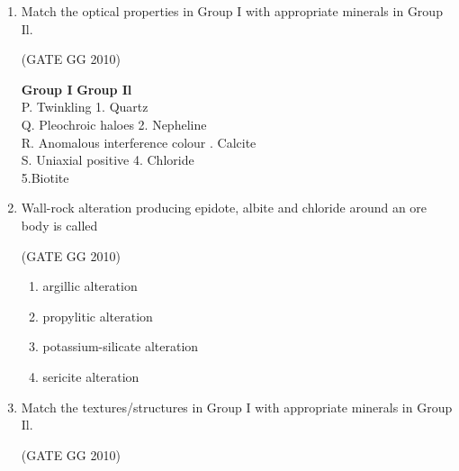 \documentclass[journal]{IEEEtran}
\begin{document}
\begin{enumerate}[start=1]
\item Match the optical properties  in Group I with appropriate minerals in Group Il.

\hfill{(GATE GG 2010)}

\vspace{0.5cm}
\textbf{Group I} \hspace{6cm}
\textbf{Group Il}\\
P. Twinkling \qquad \qquad \qquad \qquad \hspace{2.73cm}1. Quartz\\
Q. Pleochroic haloes \qquad \qquad \qquad \qquad \hspace{1.4cm}       2. Nepheline\\
R. Anomalous interference colour \qquad \qquad \qquad {}. Calcite\\
S. Uniaxial positive \quad \qquad \qquad \qquad  \hspace{1.9cm}  4. Chloride\\\hspace*{7.43cm}5.Biotite
\begin{enumerate}
\end{enumerate}

\item Wall-rock alteration producing epidote, albite and chloride around an ore body is called 

\hfill{(GATE GG 2010)}

\begin{enumerate}
    \item argillic alteration
    \item propylitic alteration
    \item potassium-silicate alteration
    \item sericite alteration
\end{enumerate}

\item Match the textures/structures  in Group I with appropriate minerals in Group Il.

\hfill{(GATE GG 2010)}


\end{enumerate}
\end{document}
